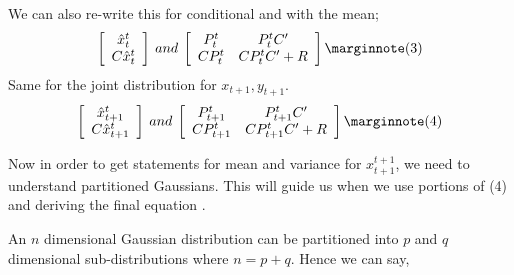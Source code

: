 We can also re-write this for conditional and with the mean;
\begin{eqnarray}
\left[ \begin{array}{c}
      \hat{x}_{t}^t \\
      C\hat{x}_{t}^t
      \end{array} \right]
\:and\:      
\left[ \begin{array}{cc}
      P_{t}^t & P_{t}^tC' \\
      CP_{t}^t & CP_{t}^tC'+R
      \end{array} \right] \mlabel{3}
\end{eqnarray}
Same for the joint distribution for $x_{t+1}, y_{t+1}$.
\begin{eqnarray}
\left[ \begin{array}{c}
      \hat{x}_{t+1}^t \\
      C\hat{x}_{t+1}^t
      \end{array} \right]
\:and\:      
\left[ \begin{array}{cc}
      P_{t+1}^t & P_{t+1}^tC' \\
      CP_{t+1}^t & CP_{t+1}^tC'+R
      \end{array} \right] \mlabel{4}
\end{eqnarray}

Now in order to get statements for mean and variance for $x_{t+1}^{t+1}$, we
need to understand partitioned Gaussians. This will guide us when we use
portions of (4) and deriving the final equation \cite{jordan}. 

An $n$ dimensional Gaussian distribution can be partitioned into $p$ and $q$
dimensional sub-distributions where $n = p + q$. Hence we can say,

